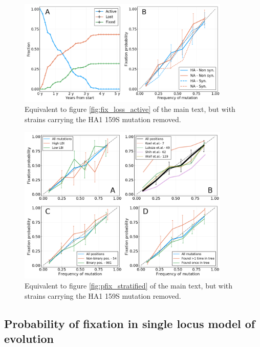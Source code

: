 \documentclass[reprint,amsmath,amssymb,superscriptaddress,showpacs,rmp]{revtex4-1}
\begin{document}
\begin{figure}
	\centering
	\includegraphics[width=0.9\textwidth]{./SM_figures/cutoff_159S_p1.png}
	\caption{Equivalent to figure \ref{fig:fix_loss_active} of the main text, but with strains carrying the HA1 159S mutation removed.}
	\label{fig:cutoff_159S_p1}
\end{figure}

\begin{figure}
	\centering
	\includegraphics[width=0.9\textwidth]{./SM_figures/pfix_v_freq_strat_h3n2_cutoff159S.png}
	\caption{Equivalent to figure \ref{fig:pfix_stratified} of the main text, but with strains carrying the HA1 159S mutation removed.}
	\label{fig:cutoff_159S_p2}
\end{figure}


\newpage
\subsection{Probability of fixation in single locus model of evolution}
\label{sub:probability_of_fixation}
\end{document}
